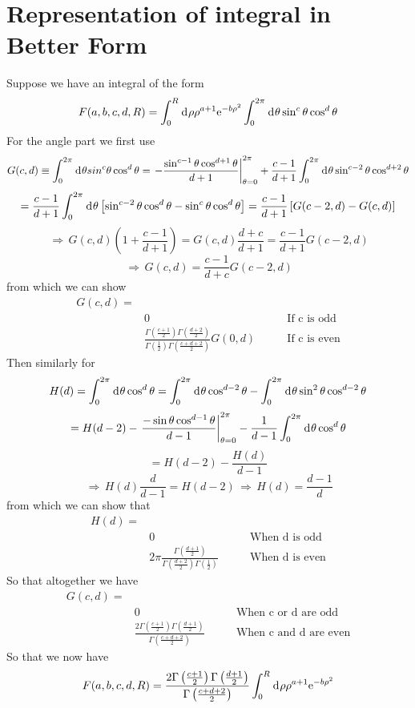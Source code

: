 \documentclass[11pt]{amsart}
\makeatletter
\newcommand{\e}{{\rm e}}				%
\newcommand{\msp}[1]{\mspace{#1mu}}		%
\newcommand{\0}{\varnothing}		%
\DeclareMathOperator*{\im}{\, \Longrightarrow \,}	%
\newcommand{\eq}{\equiv}		%
\newcommand{\tx}[1]{\text{#1}}			%
\newcommand{\dd}{\msp{1} {\rm{d}} \msp{1}}	%
\newcommand{\1}{!}
\newcommand{\2}{@}
\newcommand{\3}{\#}
\newcommand{\4}{\$}
\newcommand{\5}{\%}
\newcommand{\6}{$^\wedge$}
\newcommand{\7}{\&}
\newcommand{\8}{*}
\newcommand{\9}{(}
\makeatother
\begin{document}
\section{Representation of integral in Better Form}
Suppose we have an integral of the form
\[
F(a,b,c,d,R) = \int_0^R\dd \rho \rho^{a+1}\e^{-b\rho^2}\int_0^{2\pi}\dd \theta\sin^c \theta \cos^d\theta
\]
For the angle part we first use
\[
G(c,d) \eq \int_0^{2\pi} \dd \theta sin^c\theta \cos^d \theta = \left.-\frac{\sin^{c-1}\theta \cos^{d+1}\theta}{d+1}\right|_{\theta=0}^{2\pi} +\frac{c-1}{d+1}\int_0^{2\pi}\dd \theta \sin^{c-2}\theta\cos^{d+2}\theta \]\[= \frac{c-1}{d+1}\int_0^{2\pi}\dd \theta\left[\sin^{c-2}\theta\cos^d\theta-\sin^c\theta\cos^d \theta\right] = \frac{c-1}{d+1}\left[G(c-2,d)-G(c,d)\right]
\]
\[
\im G(c,d)\left(1+\frac{c-1}{d+1}\right) = G(c,d)\frac{d+c}{d+1}=\frac{c-1}{d+1}G(c-2,d)
\]
\[
\im G(c,d) = \frac{c-1}{d+c}G(c-2,d)
\]
from which we can show
\begin{align*}
G(c,d) =&\qquad &\\
&0\qquad &\tx{If c is odd}\\
&\frac{\Gamma\left(\frac{c+1}{2}\right)\Gamma\left(\frac{d+2}{2}\right)}{\Gamma\left(\frac{1}{2}\right)\Gamma\left(\frac{c+d+2}{2}\right)}G(0,d)	\qquad &\tx{If c is even}
\end{align*}
Then similarly for
\[
H(d) = \int_0^{2\pi}\dd \theta \cos^d\theta = \int_0^{2\pi}\dd \theta \cos^{d-2}\theta - \int_0^{2\pi}\dd \theta\sin^2\theta \cos^{d-2}\theta
\]
\[
=H(d-2) - \left.\frac{-\sin\theta\cos^{d-1}\theta}{d-1}\right|_{\theta = 0}^{2\pi} - \frac{1}{d-1}\int_0^{2\pi}\dd \theta \cos^d\theta
\]
\[
=H(d-2)-\frac{H(d)}{d-1}
\]
\[
\im H(d)\frac{d}{d-1} = H(d-2) \im H(d) = \frac{d-1}{d}
\]
from which we can show that 
\begin{align*}
H(d) =&\qquad &\\
&0\qquad &\tx{When d is odd}\\
&2\pi\frac{\Gamma\left(\frac{d+1}{2}\right)}{\Gamma\left(\frac{d+2}{2}\right)\Gamma\left(\frac{1}{2}\right)}\qquad &\tx{When d is even}
\end{align*}
So that altogether we have
\begin{align*}
G(c,d) =&\qquad &\\
&0\qquad &\tx{When c or d are odd}\\
&\frac{2\Gamma\left(\frac{c+1}{2}\right)\Gamma\left(\frac{d+1}{2}\right)}{\Gamma\left(\frac{c+d+2}{2}\right)}\qquad &\tx{When c and d are even}
\end{align*}
So that we now have
\[
F(a,b,c,d,R) = \frac{2\Gamma\left(\frac{c+1}{2}\right)\Gamma\left(\frac{d+1}{2}\right)}{\Gamma\left(\frac{c+d+2}{2}\right)}\int_0^R\dd \rho \rho^{a+1}\e^{-b\rho^2}
\]
\end{document}
